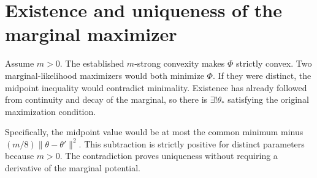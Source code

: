 \documentclass[11pt,a4paper]{article}
\begin{document}
\section{\texorpdfstring{Existence and uniqueness of the marginal maximizer}{Existence and uniqueness of the marginal maximizer}}


Assume \(m>0\). The established \(m\)-strong convexity makes \(\Phi\) strictly convex. Two marginal-likelihood maximizers would both minimize \(\Phi\). If they were distinct, the midpoint inequality would contradict minimality. Existence has already followed from continuity and decay of the marginal, so there is \(\exists!\theta_*\) satisfying the original maximization condition.



Specifically, the midpoint value would be at most the common minimum minus \((m/8)\|\theta-\theta'\|^2\). This subtraction is strictly positive for distinct parameters because \(m>0\). The contradiction proves uniqueness without requiring a derivative of the marginal potential.
\end{document}
